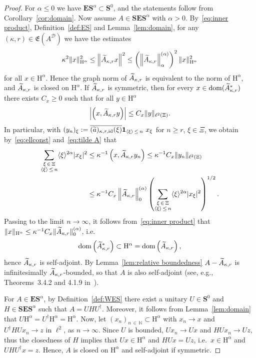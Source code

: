 \documentclass[10pt]{amsart}
\theoremstyle{definition}\newtheorem{defi}[theo]{Definition}\newtheorem{rema}[theo]{Remark}\newtheorem{exam}[theo]{Example}\newtheorem{nota}[theo]{Notation}
\DeclareMathOperator{\dom}{dom}
\DeclareMathOperator{\id}{id}
\newcommand{\RH}{\mathrm{H}}
\renewcommand{\mathsf}{\mathrm}
\newcommand{\sfH}{\mathsf{H}}
\newcommand{\N}{\mathbb N}
\newcommand{\CD}{\mathcal{D}}
\newcommand{\bone}{\boldsymbol 1}
\newcommand{\BE}{\mathbf E}
\newcommand{\BS}{\mathbf S}
\newcommand{\FE}{\mathfrak{E}}
\newcommand{\snorm}[3]{\left\| #1\right\|_{#3}^{(#2)}}
\newcommand{\ang}[1]{\langle #1 \rangle}
\newcommand{\er}{r}
\let\oldtilde\tilde
\renewcommand*{\tilde}[1]{\mathchoice{\widetilde{#1}}{\widetilde{#1}}{\oldtilde{#1}}{\oldtilde{#1}}}
\begin{document}
\begin{proof}
For $\alpha\leq 0$ we have $\BE\BS^\alpha\subset \BS^0$, and the statements follow from Corollary~\ref{cor:domain}. Now assume $A\in \BS\BE\BS^\alpha$ with $\alpha >0$. By~\eqref{eq:inner product}, Definition~\ref{def:ES} and Lemma~\ref{lem:domain}, for any $(\kappa,
\er)\in\FE(A^\CD)$ we have the estimates
\begin{equation}
\kappa^2\|x\|_{\sfH^\alpha}^2 \le \left\|\tilde A_{\kappa,\er}x\right\|^2 \le
\left(\left\|\tilde A_{\kappa,\er}\right\|^{(\alpha)}_{\alpha}\right)^2\|x\|_{\sfH^\alpha}^2
\end{equation}
for all $x \in \RH^\alpha$. Hence the graph norm of $\tilde A_{\kappa,\er}$ is equivalent to the norm of $\sfH^\alpha$, and $\tilde A_{\kappa,\er}$ is closed on $\sfH^\alpha$. If $\tilde A_{\kappa,\er}$ is symmetric, then for every $x\in\dom(\tilde A_{\kappa,\er}^*)$ there exists $C_x\geq 0$ such that for all $y \in \RH^\alpha$
\begin{equation}
\left|\left(x, \tilde A_{\kappa,\er}y\right)\right|\leq C_x\|y\|_{\ell^2(\Xi)}.
\end{equation}
In particular, with $(y_{n})_\xi:=\overline{(\tilde a)_{\kappa, \er, \id}(\xi)}\bone_{\ang
\xi\,\le\,n}\ x_\xi$ for $n\geq \er$, $\xi\in \Xi$, we obtain by~\eqref{eq:ellconst} and~\eqref{eq:tilde A} that
\begin{equation}
\begin{split}
\sum_{\substack{\xi\,\in\,\Xi \\
\ang \xi\,\le\,n}}\ang{\xi}^{2\alpha}|x_\xi|^2 &\leq \kappa^{-1}\left(x, \tilde A_{\kappa,\er}y_{n}\right)\leq
\kappa^{-1}C_x\|y_n\|_{\ell^2(\Xi)}\\
&\leq \kappa^{-1}C_x\snorm{\tilde{A}_{\kappa,\er}}{\alpha}{0}\left(\sum_{\substack{\xi\,\in\,\Xi \\ \ang \xi\,\le\,n}}\ang{\xi}^{2\alpha}|x_\xi|^2\right)^{1/2}.
\end{split}
\end{equation}
Passing to the limit $n\to \infty$, it follows from~\eqref{eq:inner product} that $\|x\|_{\sfH^\alpha} \leq
\kappa^{-1}C_x\|\tilde{A}_{\kappa,\er}\|^{(\alpha)}_{0}$, i.e.
\[
\dom\left(\tilde
A_{\kappa,\er}^*\right)\subset \sfH^\alpha =\dom\left(\tilde A_{\kappa,\er}\right),
\]
hence
$\tilde A_{\kappa,\er}$ is self-adjoint. By Lemma~\ref{lem:relative boundedness} $A -\tilde A_{\kappa,\er}$ is infinitesimally $\tilde A_{\kappa,\er}$-bounded, so that $A$ is also self-adjoint (see, e.g., Theorems~3.4.2 and 4.1.9 in~\cite{BirmanSolomyak}).

For $A\in\BE\BS^\alpha$, by Definition~\ref{def:WES} there exist a unitary $U\in\BS^0$ and $H\in\BS\BE\BS^\alpha$ such that $A=UH U^\dagger$. Moreover, it follows from Lemma~\ref{lem:domain} that $U\sfH^\alpha=U^\dagger\sfH^\alpha=\sfH^\alpha$. Now, let $(x_n)_{n\,\in\,\N}\subset\sfH^\alpha$ with $x_n\to x$ and $U^\dagger HUx_n\to z$ in $\ell^2$, as $n\to\infty$. Since $U$ is bounded, $Ux_n\to Ux$ and $HUx_n\to Uz$, thus the closedness of $H$ implies that $Ux\in \sfH^\alpha$ and $HUx=Uz$, i.e.~$x\in\sfH^\alpha$ and $U H U^\dagger x=z$. Hence, $A$ is closed on $\sfH^\alpha$ and self-adjoint if symmetric.
\end{proof}
\end{document}
